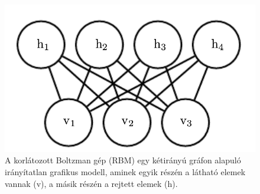 \begin{figure}[ht]
	\centering
	\includegraphics[width=0.50\columnwidth]{figures/RBM.png}
	\caption{A korlátozott Boltzman gép (RBM) egy kétirányú gráfon alapuló irányítatlan grafikus modell, aminek egyik részén a látható elemek vannak (v), a másik részén a rejtett elemek (h).}
	\label{fig:bm}
\end{figure}




